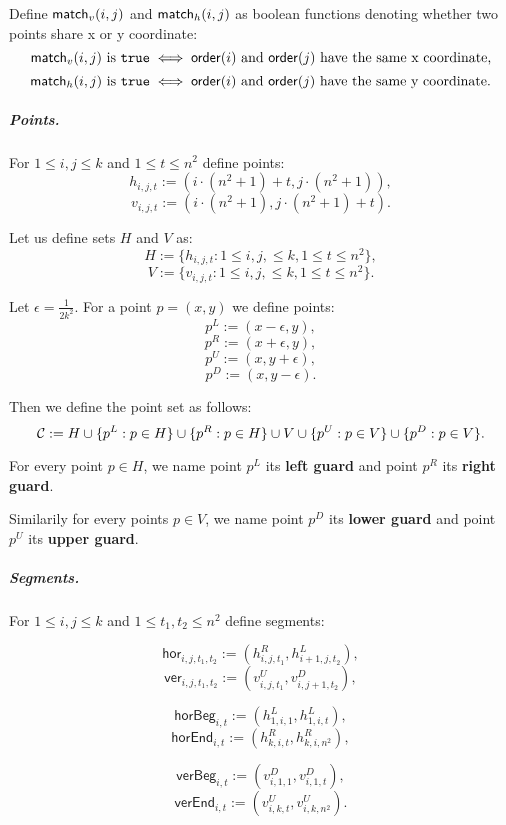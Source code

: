 Define $\mathsf{match}_v(i, j)$ and $\mathsf{match}_h(i, j)$
as boolean functions denoting whether two points share x or y coordinate:
$$\mathsf{match}_v(i, j) \text{ is } \texttt{true} \iff
\mathsf{order}(i) \text{ and } \mathsf{order}(j) \text{ have the same x coordinate,}$$
$$\mathsf{match}_h(i, j) \text{ is } \texttt{true} \iff
\mathsf{order}(i) \text{ and } \mathsf{order}(j) \text{ have the same y coordinate.}$$


\subparagraph{Points.}

For $1 \le i,j \le k$ and $1 \le t \le n^2$ define points:
	$$h_{i, j, t} := (i \cdot (n^2+1) + t, j \cdot (n^2+1)),$$
	$$v_{i, j, t} := (i \cdot (n^2+1), j \cdot (n^2+1) + t).$$
	
Let us define sets $H$ and $V$ as:
$$H := \{h_{i, j, t} : 1 \le i, j, \le k, 1 \le t \le n^2\},$$
$$V := \{v_{i, j, t} : 1 \le i, j, \le k, 1 \le t \le n^2\}.$$
	
Let $\epsilon = \frac{1}{2k^2}$.
For a point $p = (x, y)$ we define points:
$$p^{L} := (x - \epsilon, y),$$
$$p^{R} := (x + \epsilon, y),$$
$$p^{U} := (x, y + \epsilon),$$
$$p^{D} := (x, y - \epsilon).$$

Then we define the point set as follows:
$$\mathcal{C} := H \cup \{p^L : p \in H\} \cup \{p^R : p \in H\}
\cup V \cup \{p^U : p \in V\} \cup \{p^D : p \in V\}.$$

\begin{defi}
	\label{guard_def}
	For every point $p \in H$, we name point $p^L$ its \textbf{left guard}
	and point $p^R$ its \textbf{right guard}.
	
	Similarily for every points $p \in V$, we name point $p^D$ its \textbf{lower guard}
	and point $p^U$ its \textbf{upper guard}.
\end{defi}

\subparagraph{Segments.}
\newcommand{\hor}[4]{\mathsf{hor}_{#1,#2,#3,#4}}
\newcommand{\ver}[4]{\mathsf{ver}_{#1,#2,#3,#4}}
\newcommand{\horbeg}[2]{\mathsf{horBeg}_{#1,#2}}
\newcommand{\verbeg}[2]{\mathsf{verBeg}_{#1,#2}}
\newcommand{\horend}[2]{\mathsf{horEnd}_{#1,#2}}
\newcommand{\verend}[2]{\mathsf{verEnd}_{#1,#2}}

For $1 \le i,j \le k$ and $1 \le t_1, t_2 \le n^2$ define segments:

$$\hor{i}{j}{t_1}{t_2} := (h^R_{i,j,t_1}, h^L_{i+1, j, t_2}),$$
$$\ver{i}{j}{t_1}{t_2} := (v^U_{i,j,t_1}, v^D_{i, j+1, t_2}),$$

$$\horbeg{i}{t} := (h^L_{1, i, 1}, h^L_{1, i, t}),$$
$$\horend{i}{t} := (h^R_{k, i, t}, h^R_{k, i, n^2}),$$

$$\verbeg{i}{t} := (v^D_{i, 1, 1}, v^D_{i, 1, t}),$$
$$\verend{i}{t} := (v^U_{i, k, t}, v^U_{i, k, n^2}).$$

